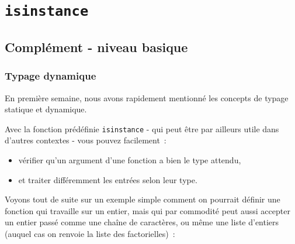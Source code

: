     
    
    
    

    

    \hypertarget{isinstance}{%
\section{\texorpdfstring{\texttt{isinstance}}{isinstance}}\label{isinstance}}

    \hypertarget{compluxe9ment---niveau-basique}{%
\subsection{Complément - niveau
basique}\label{compluxe9ment---niveau-basique}}

    \hypertarget{typage-dynamique}{%
\subsubsection{Typage dynamique}\label{typage-dynamique}}

    En première semaine, nous avons rapidement mentionné les concepts de
typage statique et dynamique.

Avec la fonction prédéfinie \texttt{isinstance} - qui peut être par
ailleurs utile dans d'autres contextes - vous pouvez facilement~:

\begin{itemize}
\tightlist
\item
  vérifier qu'un argument d'une fonction a bien le type attendu,
\item
  et traiter différemment les entrées selon leur type.
\end{itemize}

    Voyons tout de suite sur un exemple simple comment on pourrait définir
une fonction qui travaille sur un entier, mais qui par commodité peut
aussi accepter un entier passé comme une chaîne de caractères, ou même
une liste d'entiers (auquel cas on renvoie la liste des factorielles)~:


